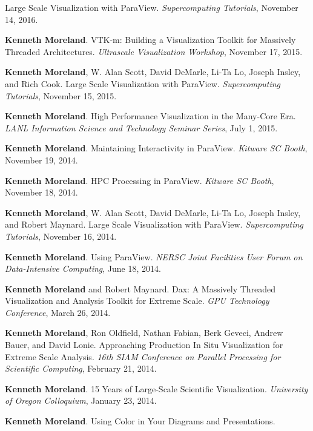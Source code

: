\begin{enumerate}[label={[\arabic*]}, left=0pt]
  Large Scale Visualization with ParaView.
  \emph{Supercomputing Tutorials}, November 14, 2016.
\item  %
  \textbf{Kenneth Moreland}.
  VTK-m: Building a Visualization Toolkit for Massively Threaded Architectures.
  \emph{Ultrascale Visualization Workshop}, November 17, 2015.
\item  %
  \textbf{Kenneth Moreland}, W. Alan Scott, David DeMarle, Li-Ta Lo, Joseph Insley, and Rich Cook.
  Large Scale Visualization with ParaView.
  \emph{Supercomputing Tutorials}, November 15, 2015.
\item  %
  \textbf{Kenneth Moreland}.
  High Performance Visualization in the Many-Core Era.
  \emph{LANL Information Science and Technology Seminar Series}, July 1, 2015.
\item  %
  \textbf{Kenneth Moreland}.
  Maintaining Interactivity in ParaView.
  \emph{Kitware SC Booth}, November 19, 2014.
\item  %
  \textbf{Kenneth Moreland}.
  HPC Processing in ParaView.
  \emph{Kitware SC Booth}, November 18, 2014.
\item  %
  \textbf{Kenneth Moreland}, W. Alan Scott, David DeMarle, Li-Ta Lo, Joseph Insley, and Robert Maynard.
  Large Scale Visualization with ParaView.
  \emph{Supercomputing Tutorials}, November 16, 2014.
\item  %
  \textbf{Kenneth Moreland}.
  Using ParaView.
  \emph{NERSC Joint Facilities User Forum on Data-Intensive Computing}, June 18, 2014.
\item  %
  \textbf{Kenneth Moreland} and Robert Maynard.
  Dax: A Massively Threaded Visualization and Analysis Toolkit for Extreme Scale.
  \emph{GPU Technology Conference}, March 26, 2014.
\item  %
  \textbf{Kenneth Moreland}, Ron Oldfield, Nathan Fabian, Berk Geveci, Andrew Bauer, and David Lonie.
  Approaching Production In Situ Visualization for Extreme Scale Analysis.
  \emph{16th SIAM Conference on Parallel Processing for Scientific Computing}, February 21, 2014.
\item  %
  \textbf{Kenneth Moreland}.
  15 Years of Large-Scale Scientific Visualization.
  \emph{University of Oregon Colloquium}, January 23, 2014.
\item  %
  \textbf{Kenneth Moreland}.
  Using Color in Your Diagrams and Presentations.

\end{enumerate}
